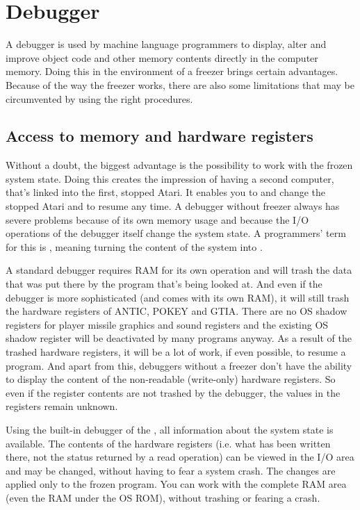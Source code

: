\section{Debugger}

A debugger is used by machine language programmers to display, alter and improve
object code and other memory contents directly in the computer memory. Doing
this in the environment of a freezer brings certain advantages. Because of the way
the freezer works, there are also some limitations that may be circumvented by
using the right procedures.

\subsection{Access to memory and hardware registers}

Without a doubt, the biggest advantage is the possibility to work with
the frozen system state. Doing this creates the impression of
having a second computer, that's linked into the first, stopped
Atari. It enables you to  and change the stopped Atari
and to resume any time. A debugger without freezer always has severe
problems because of its own memory usage and because the I/O operations of
the debugger itself change the system state. A programmers' term for this is
, meaning turning the content of the system into .

A standard debugger requires RAM for its own operation and will
trash the data that was put there by the program that's being looked at.
And even if the debugger is more sophisticated (and comes with its own RAM),
it will still trash the hardware registers of ANTIC, POKEY and GTIA. There are
no OS shadow registers for player missile graphics and sound registers and the
existing OS shadow register will be deactivated by many programs anyway.
As a result of the trashed hardware registers, it will be a lot of work, if even
possible, to resume a program. And apart from this, debuggers without a
freezer don't have the ability to display the content of the non-readable
(write-only) hardware registers. So even if the register contents are
not trashed by the debugger, the values in the registers remain unknown.

Using the built-in debugger of the \frz, all information about the system state is
available. The contents of the hardware registers (i.e. what has been written
there, not the status returned by a read operation) can be viewed in the I/O
area and may be changed, without having to fear a system crash. The changes are
applied only to the frozen program. You can work with the complete RAM area
(even the RAM under the OS ROM), without trashing or fearing a crash.

